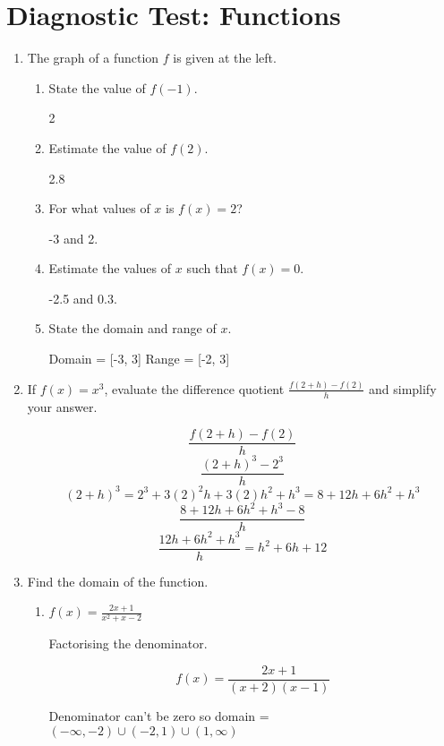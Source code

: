 \documentclass{article}
\begin{document}
\newpage

\section{Diagnostic Test: Functions}

\begin{enumerate}
	\item The graph of a function $f$ is given at the left.

	\begin{enumerate}
		\item State the value of $f(-1)$.

			2

		\item Estimate the value of $f(2)$.

			2.8

		\item For what values of $x$ is $f(x) = 2$?

			-3 and 2.

		\item Estimate the values of $x$ such that $f(x) = 0$.

			-2.5 and 0.3.

		\item State the domain and range of $x$.

			Domain = [-3, 3]
			Range = [-2, 3]
		
	\end{enumerate}

	\item If $f(x) = x^{3}$, evaluate the difference quotient $\frac{f(2 + h) - f(2)}{h}$ and simplify your answer.

		$$\frac{f(2 + h) - f(2)}{h}$$
		$$\frac{(2 + h)^3 - 2^3}{h}$$
		$$(2 + h)^3 = 2^3 + 3(2)^2h + 3(2)h^2 +  h^3 = 8 + 12h + 6h^2 + h^3$$
		$$\frac{ 8 + 12h + 6h^2 + h^3 - 8}{h}$$
		$$\frac{12h + 6h^2 + h^3}{h} = h^2 + 6h + 12$$

	\item Find the domain of the function.

	\begin{enumerate}
		\item $f(x) = \frac{2x + 1}{x^2 + x - 2}$

			Factorising the denominator.

			$$f(x) = \frac{2x + 1}{(x+2)(x-1)}$$
			
			Denominator can't be zero so domain = $(-\infty, -2) \cup (-2, 1) \cup (1,\infty)$


\end{enumerate}
\end{enumerate}
\end{document}
